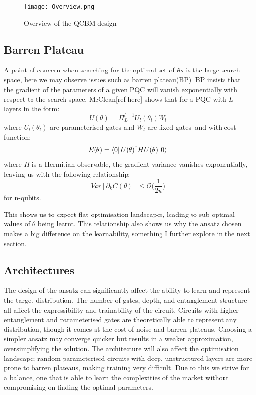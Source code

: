 \documentclass[12pt]{article}
\newcommand{\newp}
    {
    \vskip 0.5cm 
  }
\numberwithin{equation}{section}
\begin{document}
\begin{figure}[h!]
  \centering 
  \texttt{[image: Overview.png]}
  \caption{Overview of the QCBM design}
  \label{fig:overview}
\end{figure}

\newpage
\subsection{Barren Plateau}
A point of concern when searching for the optimal set of $\theta s$ is the large 
search space, here we may observe issues such as barren plateau(BP). BP 
insists that the gradient of the parameters of a given PQC will vanish exponentially 
with respect to the search space. McClean[ref here] shows that for a PQC with $L$ layers in the form: 
\begin{equation}
  U(\theta) = \Pi_L^{l=1}U_l(\theta_l)W_l
\end{equation}
where $U_l(\theta_l)$ are parameterised gates and $W_l$ are fixed gates, and with 
cost function:
\begin{equation}
E(\theta) = \bra{0}U(\theta)^\dagger HU(\theta)\ket{0}
\end{equation}
where $H$ is a Hermitian observable, the gradient variance vanishes exponentially,
leaving us with the following relationship:
\begin{equation}
  Var[\partial_kC(\theta)] \leq \mathcal{O}\bigl(\frac{1}{2n}\bigr)
\end{equation}
for n-qubits. 
\newp 
This shows us to expect flat optimisation landscapes, leading to sub-optimal values
of $\theta$ being learnt. This relationship also shows us why the ansatz chosen 
makes a big difference on the learnability, something I further explore in the 
next section. 
\subsection{Architectures}
The design of the ansatz can significantly affect the ability to learn and represent 
the target distribution. The number of gates, depth, and entanglement structure
all affect the expressibility and trainability of the circuit. Circuits with 
higher entanglement and parameterised gates are theoretically able to represent 
any distribution, though it comes at the cost of noise and barren plateaus. 
Choosing a simpler ansatz may converge quicker but results in a weaker approximation,
oversimplifying the solution.
The architecture will also affect the optimisation landscape; random parameterised 
circuits with deep, unstructured layers are more prone to barren plateaus, making 
training very difficult. Due to this we strive for a balance, one that is 
able to learn the complexities of the market without compromising on finding the 
optimal parameters.
\end{document}
